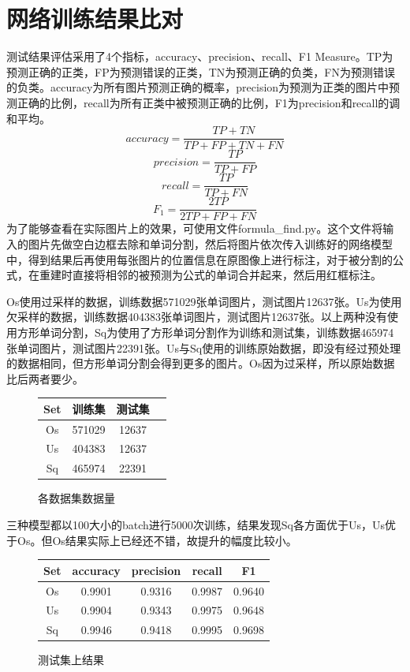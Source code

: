 \section{网络训练结果比对}
\noindent

测试结果评估采用了4个指标，accuracy、precision、recall、F1 Measure。TP为预测正确的正类，FP为预测错误的正类，TN为预测正确的负类，FN为预测错误的负类。accuracy为所有图片预测正确的概率，precision为预测为正类的图片中预测正确的比例，recall为所有正类中被预测正确的比例，F1为precision和recall的调和平均。
\[accuracy = \frac {TP + TN} {TP + FP + TN + FN}\]
\[precision = \frac {TP} {TP + FP}\]
\[recall = \frac {TP} {TP + FN}\]
\[F_1 = \frac {2 TP } {2 TP + FP + FN}\]
为了能够查看在实际图片上的效果，可使用文件formula\_find.py。这个文件将输入的图片先做空白边框去除和单词分割，然后将图片依次传入训练好的网络模型中，得到结果后再使用每张图片的位置信息在原图像上进行标注，对于被分割的公式，在重建时直接将相邻的被预测为公式的单词合并起来，然后用红框标注。

Os使用过采样的数据，训练数据571029张单词图片，测试图片12637张。Us为使用欠采样的数据，训练数据404383张单词图片，测试图片12637张。以上两种没有使用方形单词分割，Sq为使用了方形单词分割作为训练和测试集，训练数据465974张单词图片，测试图片22391张。Us与Sq使用的训练原始数据，即没有经过预处理的数据相同，但方形单词分割会得到更多的图片。Os因为过采样，所以原始数据比后两者要少。

\begin{figure}[hp]
    \centering
    \begin{tabular}{cccc}
    \toprule
    Set& 训练集& 测试集\\
    \midrule
    Os& 571029& 12637\\
    Us& 404383& 12637\\
    Sq& 465974& 22391\\
    \bottomrule
    \end{tabular}
    \caption{各数据集数据量}
\end{figure}

三种模型都以100大小的batch进行5000次训练，结果发现Sq各方面优于Us，Us优于Os。但Os结果实际上已经还不错，故提升的幅度比较小。

\begin{figure}[hp]
\centering
\begin{tabular}{ccccc}
\toprule
Set& accuracy& precision& recall& F1\\
\midrule
Os& 0.9901& 0.9316& 0.9987& 0.9640\\
Us& 0.9904& 0.9343& 0.9975& 0.9648\\
Sq& 0.9946& 0.9418& 0.9995& 0.9698\\
\bottomrule
\end{tabular}
\caption{测试集上结果}
\end{figure}

